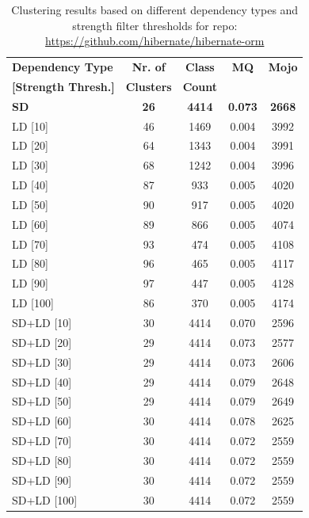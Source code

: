 \documentclass{ieeeaccess}
\begin{document}
\begin{table}[h]
\caption{Clustering results based on different dependency types and strength filter thresholds for repo: \href{https://github.com/hibernate/hibernate-orm}{https://github.com/hibernate/hibernate-orm}}
\label{tab:clustering_results_hibernate}
\centering
\setlength{\tabcolsep}{10pt}
\begin{tabular}{|l|c|c|c|c|}
\hline
\textbf{Dependency Type} & \textbf{Nr. of} & \textbf{Class} & \textbf{MQ} & \textbf{Mojo} \\
\textbf{[Strength Thresh.]} & \textbf{Clusters} & \textbf{Count} &  &  \\
\hline
\textbf{SD} & \textbf{26} & \textbf{4414} & \textbf{0.073} & \textbf{2668} \\
LD [10] & 46 & 1469 & 0.004 & 3992 \\
LD [20] & 64 & 1343 & 0.004 & 3991 \\
LD [30] & 68 & 1242 & 0.004 & 3996 \\
LD [40] & 87 & 933 & 0.005 & 4020 \\
LD [50] & 90 & 917 & 0.005 & 4020 \\
LD [60] & 89 & 866 & 0.005 & 4074 \\
LD [70] & 93 & 474 & 0.005 & 4108 \\
LD [80] & 96 & 465 & 0.005 & 4117 \\
LD [90] & 97 & 447 & 0.005 & 4128 \\
LD [100] & 86 & 370 & 0.005 & 4174 \\
\hline
SD+LD [10] & 30 & 4414 & 0.070 & 2596 \\
SD+LD [20] & 29 & 4414 & 0.073 & 2577 \\
SD+LD [30] & 29 & 4414 & 0.073 & 2606 \\
SD+LD [40] & 29 & 4414 & 0.079 & 2648 \\
SD+LD [50] & 29 & 4414 & 0.079 & 2649 \\
SD+LD [60] & 30 & 4414 & 0.078 & 2625 \\
SD+LD [70] & 30 & 4414 & 0.072 & 2559 \\
SD+LD [80] & 30 & 4414 & 0.072 & 2559 \\
SD+LD [90] & 30 & 4414 & 0.072 & 2559 \\
SD+LD [100] & 30 & 4414 & 0.072 & 2559 \\
\hline
\end{tabular}
\end{table}
\end{document}
